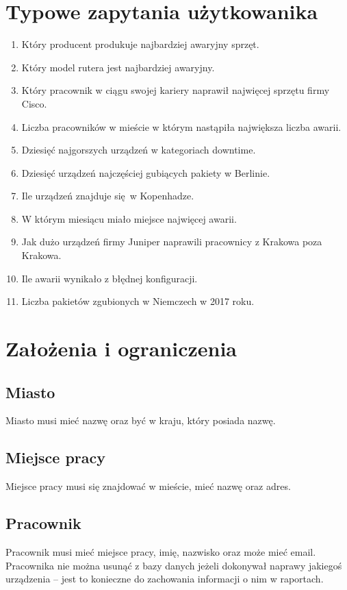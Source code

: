 \documentclass[a4paper, 12pt]{article}
\begin{document}
    \section{Typowe zapytania użytkowanika}
        \begin{enumerate}
            \item Który producent produkuje najbardziej awaryjny sprzęt.
            \item Który model rutera jest najbardziej awaryjny.
            \item Który pracownik w ciągu swojej kariery naprawił najwięcej
                sprzętu firmy Cisco.
            \item Liczba pracowników w mieście w którym nastąpiła największa
                liczba awarii.
            \item Dziesięć najgorszych urządzeń w kategoriach downtime.
            \item Dziesięć urządzeń najczęściej gubiących pakiety w Berlinie.
            \item Ile urządzeń znajduje się w Kopenhadze.
            \item W którym miesiącu miało miejsce najwięcej awarii.
            \item Jak dużo urządzeń firmy Juniper naprawili pracownicy z Krakowa
                poza Krakowa. 
            \item Ile awarii wynikało z błędnej konfiguracji.
            \item Liczba pakietów zgubionych w Niemczech w 2017 roku.
        \end{enumerate}
    \section{Założenia i ograniczenia}
        \subsection{Miasto}
            Miasto musi mieć nazwę oraz być w kraju, który posiada nazwę.
        \subsection{Miejsce pracy}
            Miejsce pracy musi się znajdować w mieście, mieć nazwę oraz adres.
        \subsection{Pracownik}
            Pracownik musi mieć miejsce pracy, imię, nazwisko oraz może mieć
            email. Pracownika nie można usunąć z bazy danych jeżeli dokonywał
            naprawy jakiegoś urządzenia -- jest to konieczne do zachowania 
            informacji o nim w raportach.
\end{document}
